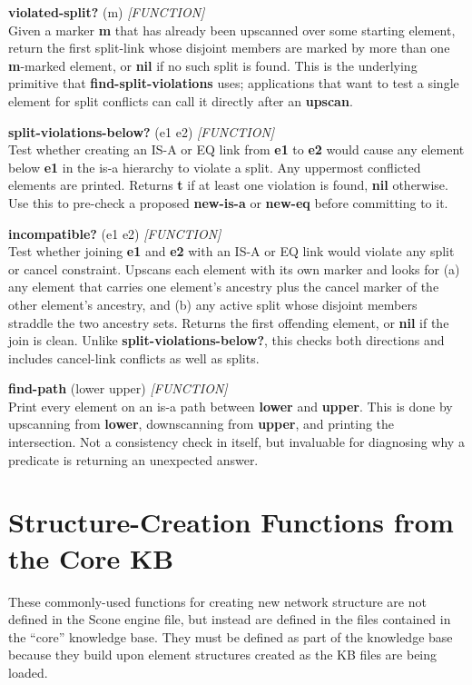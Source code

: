 \documentclass[titlepage,twoside,openright,11pt]{article}
\begin{document}
\textbf{violated-split?} (m) \emph{{[}FUNCTION{]}}\\
Given a marker \textbf{m} that has already been upscanned over some
starting element, return the first split-link whose disjoint members
are marked by more than one \textbf{m}-marked element, or \textbf{nil}
if no such split is found. This is the underlying primitive that
\textbf{find-split-violations} uses; applications that want to test a
single element for split conflicts can call it directly after an
\textbf{upscan}.

\textbf{split-violations-below?} (e1 e2) \emph{{[}FUNCTION{]}}\\
Test whether creating an IS-A or EQ link from \textbf{e1} to
\textbf{e2} would cause any element below \textbf{e1} in the is-a
hierarchy to violate a split. Any uppermost conflicted elements are
printed. Returns \textbf{t} if at least one violation is found,
\textbf{nil} otherwise. Use this to pre-check a proposed
\textbf{new-is-a} or \textbf{new-eq} before committing to it.

\textbf{incompatible?} (e1 e2) \emph{{[}FUNCTION{]}}\\
Test whether joining \textbf{e1} and \textbf{e2} with an IS-A or EQ
link would violate any split or cancel constraint. Upscans each
element with its own marker and looks for (a) any element that carries
one element's ancestry plus the cancel marker of the other element's
ancestry, and (b) any active split whose disjoint members straddle the
two ancestry sets. Returns the first offending element, or \textbf{nil}
if the join is clean. Unlike \textbf{split-violations-below?}, this
checks both directions and includes cancel-link conflicts as well as
splits.

\textbf{find-path} (lower upper) \emph{{[}FUNCTION{]}}\\
Print every element on an is-a path between \textbf{lower} and
\textbf{upper}. This is done by upscanning from \textbf{lower},
downscanning from \textbf{upper}, and printing the intersection. Not a
consistency check in itself, but invaluable for diagnosing why a
predicate is returning an unexpected answer.

\section{Structure-Creation Functions from the Core
KB}\label{structure-creation-functions-from-the-core-kb}

These commonly-used functions for creating new network structure are not
defined in the Scone engine file, but instead are defined in the files
contained in the ``core'' knowledge base. They must be defined as part
of the knowledge base because they build upon element structures created
as the KB files are being loaded.
\end{document}
